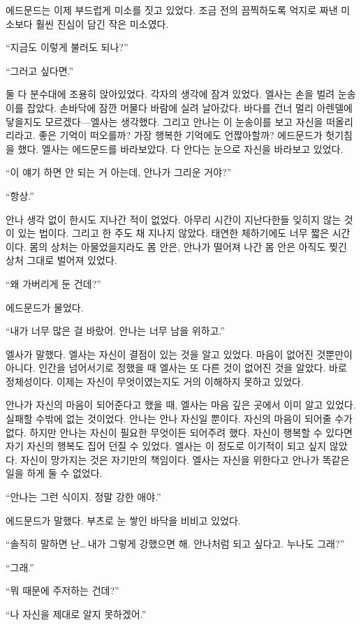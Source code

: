 에드문드는 이제 부드럽게 미소를 짓고 있었다. 조금 전의 끔찍하도록 억지로 짜낸 미소보다 훨씬 진심이 담긴 작은 미소였다.

``지금도 이렇게 불러도 되나?''

``그러고 싶다면.''

둘 다 분수대에 조용히 앉아있었다. 각자의 생각에 잠겨 있었다. 엘사는 손을 벌려 눈송이를 잡았다. 손바닥에 잠깐 머물다 바람에 실려 날아갔다. 바다를 건너 멀리 아렌델에 닿을지도 모르겠다—엘사는 생각했다. 그리고 안나는 이 눈송이를 보고 자신을 떠올리리라고. 좋은 기억이 떠오를까? 가장 행복한 기억에도 언짢아할까? 에드문드가 헛기침을 했다. 엘사는 에드문드를 바라보았다. 다 안다는 눈으로 자신을 바라보고 있었다.

``이 얘기 하면 안 되는 거 아는데, 안나가 그리운 거야?''

``항상.''

안나 생각 없이 한시도 지나간 적이 없었다. 아무리 시간이 지난다한들 잊히지 않는 것이 있는 법이다. 그리고 한 주도 채 지나지 않았다. 태연한 체하기에도 너무 짧은 시간이다. 몸의 상처는 아물었을지라도 몸 안은, 안나가 떨어져 나간 몸 안은 아직도 찢긴 상처 그대로 벌어져 있었다.

``왜 가버리게 둔 건데?''

에드문드가 물었다.

``내가 너무 많은 걸 바랐어. 안나는 너무 남을 위하고.''

엘사가 말했다. 엘사는 자신이 결점이 있는 것을 알고 있었다. 마음이 없어진 것뿐만이 아니다. 인간을 넘어서기로 정했을 때 엘사는 또 다른 것이 없어진 것을 알았다. 바로 정체성이다. 이제는 자신이 무엇이였는지도 거의 이해하지 못하고 있었다.

안나가 자신의 마음이 되어준다고 했을 때, 엘사는 마음 깊은 곳에서 이미 알고 있었다. 실패할 수밖에 없는 것이었다. 안나는 안나 자신일 뿐이다. 자신의 마음이 되어줄 수가 없다. 하지만 안나는 자신이 필요한 무엇이든 되어주려 했다. 자신이 행복할 수 있다면 자기 자신의 행복도 집어 던질 수 있었다. 엘사는 이 정도로 이기적이 되고 싶지 않았다. 자신이 망가지는 것은 자기만의 책임이다. 엘사는 자신을 위한다고 안나가 똑같은 일을 하게 둘 수 없었다.

``안나는 그런 식이지. 정말 강한 애야.''

에드문드가 말했다. 부츠로 눈 쌓인 바닥을 비비고 있었다.

``솔직히 말하면 난\ldots\,내가 그렇게 강했으면 해. 안나처럼 되고 싶다고. 누나도 그래?''

``그래.''

``뭐 때문에 주저하는 건데?''

``나 자신을 제대로 알지 못하겠어.''

